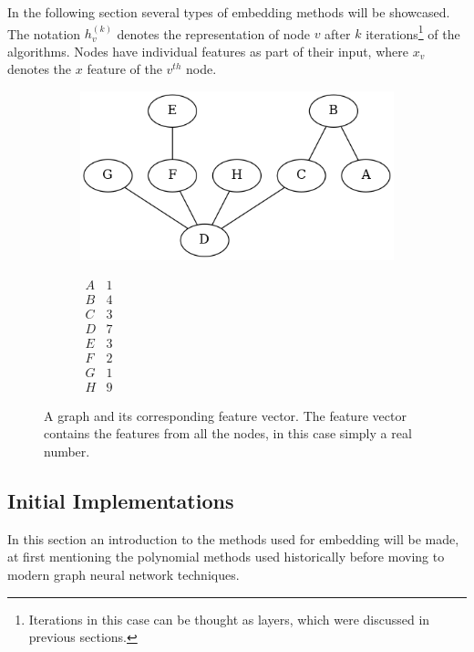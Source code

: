 In the following section several types of embedding methods will be
showcased. The notation $h_v^{(k)}$ denotes the representation of node
$v$ after $k$ iterations\footnote{Iterations in this case can be
thought as layers, which were discussed in previous sections.} of the
algorithms. Nodes have individual features as part of their input,
where $x_v$ denotes the $x$ feature of the $v^{th}$ node.
\begin{figure}[H]
     \begin{subfigure}[c]{0.4\textwidth}
         \centering
         \includegraphics[scale=0.5]{Figures/chap_gnn/edge_features.png}
  \label{fig:feature_map}
     \end{subfigure}
     \hfill
     \begin{subfigure}[c]{0.4\textwidth}
       \centering
$ \begin{matrix}
A & 1 \\
B & 4 \\
C & 3 \\
D & 7 \\
E & 3 \\
F & 2 \\
G & 1 \\
H & 9 
  \end{matrix}  $
\end{subfigure}
\caption{A graph and its corresponding feature vector. The feature
  vector contains the features from all the nodes, in this case simply
a real number.}
\label{fig:combo_feature}
\end{figure}

\subsection{Initial Implementations}

In this section an introduction to the methods used for embedding
will be made, at first mentioning the polynomial methods used
historically before moving to modern graph neural network techniques.

